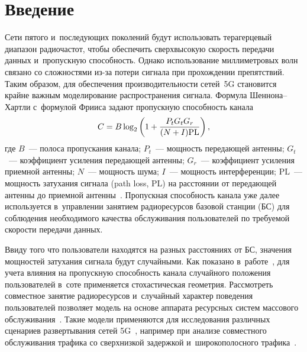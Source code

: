 
  



\thispagestyle{headings}

\begin{multicols}{2}

\label{st\stat}



\section{Введение}

Сети пятого и~последующих поколений будут использовать терагерцевый 
диапазон радиочастот, чтобы обеспечить сверхвысокую скорость передачи данных и~пропускную способность. Однако использование миллиметровых волн связано со 
сложностями из-за потери сигнала при про\-хож\-де\-нии препятствий. Таким образом, для 
обеспечения производительности сетей~5G становится крайне важным моделирование 
распространения сигнала. Формула Шен\-но\-на--Харт\-ли с~формулой Фрииса задают 
пропускную способность канала
$$
C=B \log_2 \left(1+\displaystyle\frac{\displaystyle P_t G_t G_r\mathstrut}{\displaystyle (N+I) \mathrm{PL}\mathstrut}\right),
$$
 где $B$~--- полоса 
пропускания канала; $P_t$~--- мощ\-ность передающей антенны; $G_t$~--- коэффициент 
усиления передающей антенны; $G_r$~--- коэффициент усиления приемной антенны; $N$~--- мощ\-ность шума; 
$I$~--- мощ\-ность интерференции; $\mathrm{PL}$~--- мощ\-ность затухания 
сигнала (path loss, PL) на расстоянии от передающей антенны до приемной 
антенны~\cite{Moltchanov2022a}.
Пропускная способность канала уже далее используется в~управ\-ле\-нии занятием 
радиоресурсов базовой станции (БС) для соблюдения необходимого качества обслуживания 
пользователей по требуемой ско\-рости передачи данных.

 Ввиду того что пользователи находятся на разных расстояниях от БС, 
значения мощностей затухания сигнала будут случайными. Как показано в~работе~\cite{Hmamouche2021}, для учета влияния на пропускную\linebreak
 способность канала 
случайного положения пользователей в~соте применяется стохастическая гео\-мет\-рия. 
Рассмотреть совместное занятие радиоресурсов и~случайный характер поведения 
пользователей позволяет модель на основе аппарата \mbox{ресурсных} сис\-тем массового 
обслуживания~\cite{Naumov2016, Gorbunova2018}. Такие модели применяются для 
исследования различных сценариев развертывания сетей 
5G~\cite{Moltchanov2022b, Markova2019}, например при анализе совместного 
обслуживания трафика со сверхнизкой задержкой и~широкополосного трафика~\cite{Kochetkova2021}.


\end{multicols}
